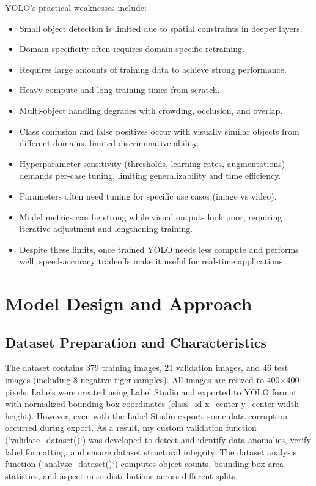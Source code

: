 \documentclass[conference]{IEEEtran}
\begin{document}
YOLO's practical weaknesses include:
\begin{itemize}
\item Small object detection is limited due to spatial constraints in deeper layers.
\item Domain specificity often requires domain-specific retraining.
\item Requires large amounts of training data to achieve strong performance.
\item Heavy compute and long training times from scratch.
\item Multi-object handling degrades with crowding, occlusion, and overlap.
\item Class confusion and false positives occur with visually similar objects from different domains, limited discriminative ability.
\item Hyperparameter sensitivity (thresholds, learning rates, augmentations) demands per-case tuning, limiting generalizability and time efficiency.
\item Parameters often need tuning for specific use cases (image vs video).
\item Model metrics can be strong while visual outputs look poor, requiring iterative adjustment and lengthening training.
\item Despite these limits, once trained YOLO needs less compute and performs well; speed-accuracy tradeoffs make it useful for real-time applications \cite{b3}.
\end{itemize}%

\section{Model Design and Approach}

\subsection{Dataset Preparation and Characteristics}

The dataset contains 379 training images, 21 validation images, and 46 test images (including 8 negative tiger samples). All images are resized to 400×400 pixels. Labels were created using Label Studio and exported to YOLO format with normalized bounding box coordinates (class\_id x\_center y\_center width height). However, even with the Label Studio export, some data corruption occurred during export. As a result, my custom validation function (`validate\_dataset()`) was developed to detect and identify data anomalies, verify label formatting, and ensure dataset structural integrity. The dataset analysis function (`analyze\_dataset()`) computes object counts, bounding box area statistics, and aspect ratio distributions across different splits.
\end{document}
